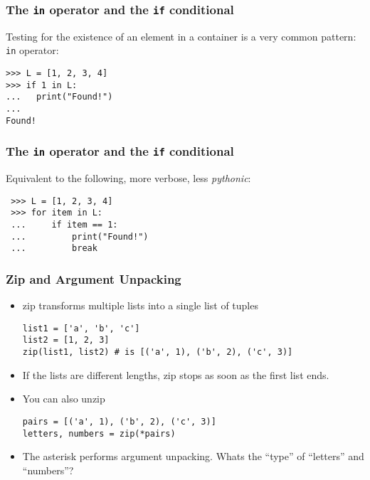 \begin{frame}[fragile]\frametitle{The \texttt{in} operator and the \texttt{if} conditional}

  Testing for the existence of an element in a container is a very
  common pattern:
  \texttt{in} operator:

\begin{lstlisting}
>>> L = [1, 2, 3, 4]
>>> if 1 in L:
...   print("Found!")
...
Found!
\end{lstlisting}
\end{frame}


\begin{frame}[fragile]\frametitle{The \texttt{in} operator and the \texttt{if} conditional}

Equivalent to the following, more verbose, less \textit{pythonic}:
 \begin{lstlisting}
 >>> L = [1, 2, 3, 4]
 >>> for item in L:
 ...     if item == 1:
 ...         print("Found!")
 ...         break
 \end{lstlisting}
\end{frame}


\begin{frame}[fragile]\frametitle{Zip and Argument Unpacking}
  \begin{itemize}
  \item zip transforms multiple lists into a single list of tuples
  \begin{lstlisting}
list1 = ['a', 'b', 'c']
list2 = [1, 2, 3]
zip(list1, list2) # is [('a', 1), ('b', 2), ('c', 3)]
  \end{lstlisting}
\item 	If the	lists are different lengths, zip stops as soon as the first list ends.
\item You can also unzip
  \begin{lstlisting}
pairs = [('a', 1), ('b', 2), ('c', 3)]
letters, numbers = zip(*pairs)
  \end{lstlisting}
\item The asterisk performs argument unpacking. Whats the ``type'' of ``letters'' and ``numbers''?
  \end{itemize}
\end{frame}

